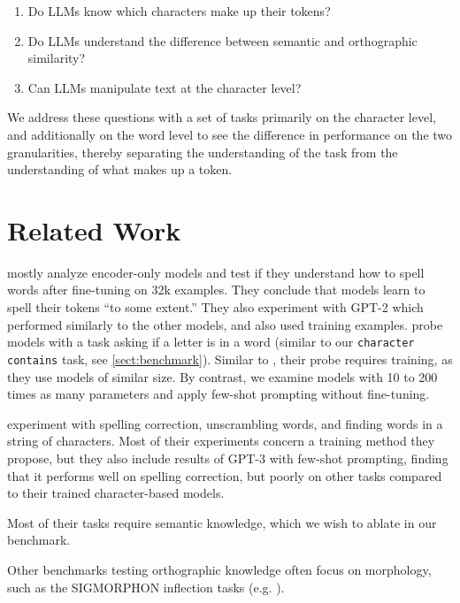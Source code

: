 \begin{enumerate}
    \itemsep-5pt
    \item Do LLMs know which characters make up their tokens?
    \item Do LLMs understand the difference between semantic and orthographic similarity?
    \item Can LLMs manipulate text at the character level?
\end{enumerate}

We address these questions with a set of tasks primarily on the character level, and additionally on the word level to see the difference in performance on the two granularities, thereby separating the understanding of the task from the understanding of what makes up a token.

\section{Related Work}

\citet{itzhak-levy-2022-models} mostly analyze encoder-only models and test if they understand how to spell words after fine-tuning on 32k examples. They conclude that models learn to spell their tokens ``to some extent.'' They also experiment with GPT-2 \cite{radford2019language} which performed similarly to the other models, and also used training examples. \citet{kaushal-mahowald-2022-tokens} probe models with a task asking if a letter is in a word (similar to our \texttt{character contains} task, see \ref{sect:benchmark}). Similar to \citet{itzhak-levy-2022-models}, their probe requires training, as they use models of similar size. By contrast, we examine models with 10 to 200 times as many parameters and apply few-shot prompting without fine-tuning.

\citet{huang-etal-2023-inducing} 
experiment with spelling correction, unscrambling words, and finding words in a string of characters. Most of their experiments concern a training method they propose, but they also include results of GPT-3 \cite{brown2020language} with few-shot prompting, finding that it performs well on spelling correction, but poorly  on other tasks compared to their trained character-based models.

Most of their tasks require semantic knowledge, which we wish to ablate in our benchmark.

Other benchmarks testing orthographic knowledge often focus on morphology, such as the SIGMORPHON inflection tasks (e.g. \citet{goldman-etal-2023-sigmorphon}). 

